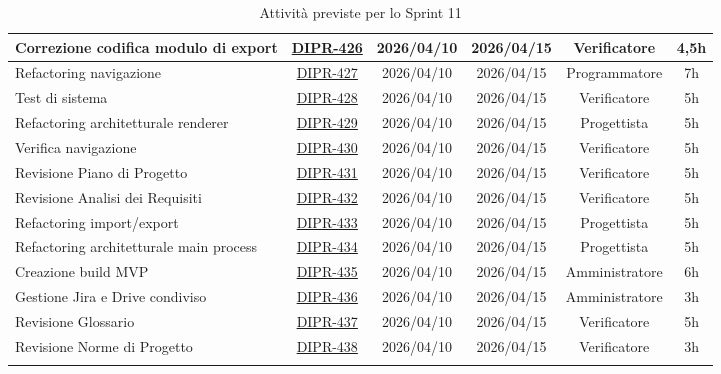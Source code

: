 \documentclass[a4paper,12pt]{article}
\begin{document}
\begin{spacing}{1}
\begin{longtable}{|p{4cm}|c|c|c|c|c|}
        Correzione codifica modulo di export & \href{https://7zpus.atlassian.net/browse/DIPR-426}{DIPR-426} & 2026/04/10 & 2026/04/15 & Verificatore & 4,5h \\
        \hline
        Refactoring navigazione & \href{https://7zpus.atlassian.net/browse/DIPR-427}{DIPR-427} & 2026/04/10 & 2026/04/15 & Programmatore & 7h \\
        \hline
        Test di sistema & \href{https://7zpus.atlassian.net/browse/DIPR-428}{DIPR-428} & 2026/04/10 & 2026/04/15 & Verificatore & 5h \\
        \hline
        Refactoring architetturale renderer & \href{https://7zpus.atlassian.net/browse/DIPR-429}{DIPR-429} & 2026/04/10 & 2026/04/15 & Progettista & 5h \\
        \hline
        Verifica navigazione & \href{https://7zpus.atlassian.net/browse/DIPR-430}{DIPR-430} & 2026/04/10 & 2026/04/15 & Verificatore & 5h \\
        \hline
        Revisione Piano di Progetto & \href{https://7zpus.atlassian.net/browse/DIPR-431}{DIPR-431} & 2026/04/10 & 2026/04/15 & Verificatore & 5h \\
        \hline
        Revisione Analisi dei Requisiti & \href{https://7zpus.atlassian.net/browse/DIPR-432}{DIPR-432} & 2026/04/10 & 2026/04/15 & Verificatore & 5h \\
        \hline
        Refactoring import/export & \href{https://7zpus.atlassian.net/browse/DIPR-433}{DIPR-433} & 2026/04/10 & 2026/04/15 & Progettista & 5h \\
        \hline
        Refactoring architetturale main process & \href{https://7zpus.atlassian.net/browse/DIPR-434}{DIPR-434} & 2026/04/10 & 2026/04/15 & Progettista & 5h \\
        \hline
        Creazione build MVP & \href{https://7zpus.atlassian.net/browse/DIPR-435}{DIPR-435} & 2026/04/10 & 2026/04/15 & Amministratore & 6h \\
        \hline
        Gestione Jira e Drive condiviso & \href{https://7zpus.atlassian.net/browse/DIPR-436}{DIPR-436} & 2026/04/10 & 2026/04/15 & Amministratore & 3h \\
        \hline
        Revisione Glossario & \href{https://7zpus.atlassian.net/browse/DIPR-437}{DIPR-437} & 2026/04/10 & 2026/04/15 & Verificatore & 5h \\
        \hline
        Revisione Norme di Progetto & \href{https://7zpus.atlassian.net/browse/DIPR-438}{DIPR-438} & 2026/04/10 & 2026/04/15 & Verificatore & 3h \\
        \hline
        \rowcolor{white}
        \caption{Attività previste per lo Sprint 11}
    \end{longtable}
    \end{spacing}
\end{document}
